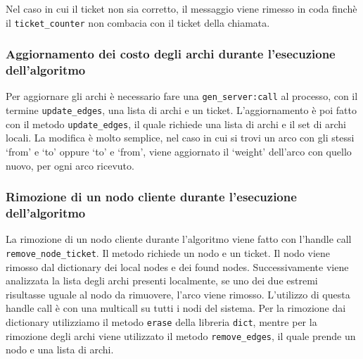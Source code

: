Nel caso in cui il ticket non sia corretto, il messaggio viene rimesso in coda finchè il \texttt{ticket\_counter} non combacia con il ticket della chiamata.

\subsubsection{Aggiornamento dei costo degli archi durante l'esecuzione dell'algoritmo}
Per aggiornare gli archi è necessario fare una \texttt{gen\_server:call} al processo, con il termine
\texttt{update\_edges}, una lista di archi e un ticket.
L'aggiornamento è poi fatto con il metodo \texttt{update\_edges}, il quale richiede una lista di archi e il set di archi locali.
La modifica è molto semplice, nel caso in cui si trovi un arco con gli stessi `from' e `to' oppure `to' e `from', viene aggiornato il `weight' dell'arco con quello nuovo, per ogni arco ricevuto.

\subsubsection{Rimozione di un nodo cliente durante l'esecuzione dell'algoritmo}
La rimozione di un nodo cliente durante l'algoritmo viene fatto con l'handle call \texttt{remove\_node\_ticket}. Il metodo richiede un nodo e un ticket. Il nodo viene rimosso dal dictionary dei local nodes e dei found nodes. Successivamente viene analizzata la lista degli archi presenti localmente, se uno dei due estremi risultasse uguale al nodo da rimuovere, l'arco viene rimosso.
L'utilizzo di questa handle call è con una multicall su tutti i nodi del sistema. Per la rimozione dai dictionary utilizziamo il metodo \texttt{erase} della libreria \texttt{dict}, mentre per la rimozione degli archi viene utilizzato il metodo \texttt{remove\_edges}, il quale prende un nodo e una lista di archi.

